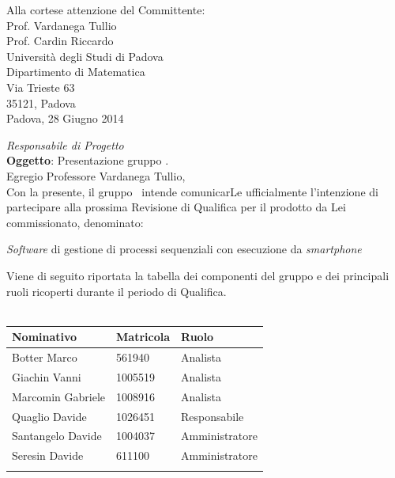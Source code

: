 \documentclass[11pt,a4paper]{article}
\begin{document}
\begin{flushright}
Alla cortese attenzione del Committente:\\
Prof. Vardanega Tullio\\
Prof. Cardin Riccardo\\
Università degli Studi di Padova\\
Dipartimento di Matematica\\
Via Trieste 63\\
35121, Padova\\
\bigskip
Padova, 28 Giugno 2014\\
\end{flushright}
\textit{Responsabile di Progetto} \gruppo\\
\medskip
\textbf{Oggetto}: Presentazione gruppo \gruppo.\\
Egregio Professore Vardanega Tullio,\\
Con la presente, il gruppo \gruppo ~intende comunicarLe ufficialmente l'intenzione di partecipare alla prossima Revisione di Qualifica per il prodotto da Lei commissionato, denominato:\\
\begin{center}
\textbf{\progetto} \textit{Software} di gestione di processi sequenziali con esecuzione da \textit{smartphone}\\
\end{center}
Viene di seguito riportata la tabella dei componenti del gruppo \gruppo{} e dei principali ruoli ricoperti durante il periodo di Qualifica.\\
\\
\begin{tabular}{l l l}
\hline
\textbf{Nominativo} & \textbf{Matricola} & \textbf{Ruolo}\\
\hline
Botter Marco & 561940 & Analista\\ %
\hline
Giachin Vanni & 1005519 & Analista\\ %
\hline
Marcomin Gabriele & 1008916 & Analista\\ %
\hline
Quaglio Davide & 1026451 &  Responsabile\\ %
\hline
Santangelo Davide & 1004037 & Amministratore\\ %
\hline
Seresin Davide & 611100 & Amministratore\\ %
\hline
\\
\end{tabular}\\
\end{document}
